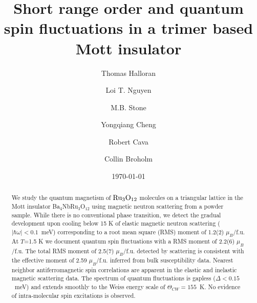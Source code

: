 \documentclass[%
 reprint,
superscriptaddress,
 amsmath,amssymb,
 aps,
 prb,
]{revtex4-2}
\begin{document}

\title{Short range order and quantum spin fluctuations in a trimer based Mott insulator}

\author{Thomas Halloran}

\author{Loi T. Nguyen}

\author{M.B. Stone}

\author{Yongqiang Cheng}

\author{Robert Cava}

\author{Collin Broholm}

\date{\today}%

\begin{abstract}
We study the quantum magnetism of $\rm Ru_3O_{12}$ molecules on a triangular lattice in the Mott insulator Ba$_4$NbRu$_3$O$_{12}$ using magnetic neutron scattering from a powder sample. While there is no conventional phase transition, we detect the gradual development upon cooling below 15 K of elastic magnetic neutron scattering ($|\hbar\omega|<0.1$~meV) corresponding to a root mean square (RMS) moment of 1.2(2) $\mu_B$/f.u. At $T$=1.5 K we document quantum spin fluctuations with a RMS moment of 2.2(6) $\mu_B$/f.u. The total RMS moment of 2.5(7) $\mu_B$/f.u. detected by scattering is consistent with the effective moment of 2.59 $\mu_B$/f.u.  inferred from bulk susceptibility data. Nearest neighbor antiferromagnetic spin correlations are apparent in the elastic and inelastic magnetic scattering data.  The spectrum of quantum fluctuations is gapless ($\Delta<0.15$~meV) and extends smoothly to the Weiss energy scale of $\Theta_{CW}=155$~K. No evidence of intra-molecular spin excitations is observed.  
\end{abstract}
\end{document}
